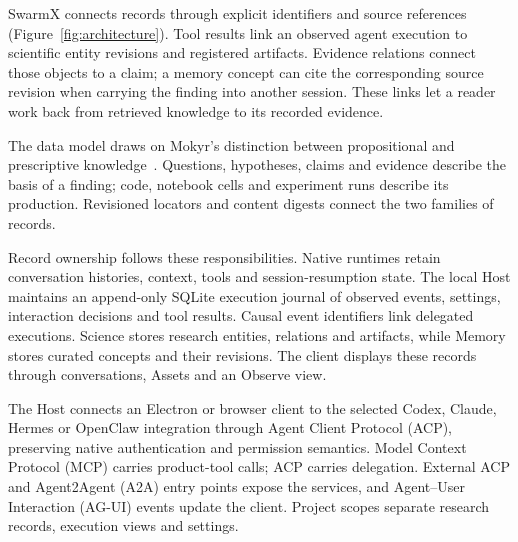 \documentclass[preprint,12pt,a4paper]{elsarticle}
\begin{document}
SwarmX connects records through explicit identifiers and source references
(Figure~\ref{fig:architecture}). Tool results link an observed agent execution to scientific
entity revisions and registered artifacts. Evidence relations connect those objects to a claim;
a memory concept can cite the corresponding source revision when carrying the finding into
another session. These links let a reader work back from retrieved knowledge to its recorded
evidence.

The data model draws on Mokyr's distinction between propositional and prescriptive
knowledge~\cite{mokyr2005}. Questions, hypotheses, claims and evidence describe the basis of
a finding; code, notebook cells and experiment runs describe its production. Revisioned
locators and content digests connect the two families of records.

Record ownership follows these responsibilities. Native runtimes retain conversation histories,
context, tools and session-resumption state. The local Host maintains an append-only SQLite
execution journal of observed events, settings, interaction decisions and tool results.
Causal event identifiers link delegated executions. Science stores research entities,
relations and artifacts, while Memory stores curated concepts and their revisions. The client
displays these records through conversations, Assets and an Observe view.

The Host connects an Electron or browser client to the selected Codex, Claude, Hermes or
OpenClaw integration through Agent Client Protocol (ACP), preserving native authentication
and permission semantics. Model Context Protocol (MCP) carries product-tool calls; ACP
carries delegation. External ACP and Agent2Agent (A2A) entry points expose the services,
and Agent--User Interaction (AG-UI) events update the client. Project scopes separate
research records, execution views and settings.
\end{document}
